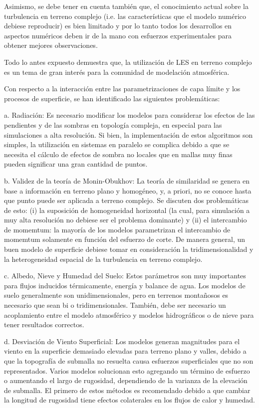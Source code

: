 Asimismo, se debe tener en cuenta también que, el conocimiento actual sobre la turbulencia en terreno complejo (i.e. las características que el modelo numérico debiese reproducir) es bien limitado y por lo tanto todos los desarrollos en aspectos numéricos deben ir de la mano con esfuerzos experimentales para obtener mejores observaciones.

Todo lo antes expuesto demuestra que, la utilización de LES en terreno complejo es un tema de gran interés para la comunidad de modelación atmosférica.

Con respecto a la interacción entre las parametrizaciones de capa límite y los procesos de superficie, se han identificado las siguientes problemáticas:
\begin{enumerate*}
	\item[a.] Radiación: Es necesario modificar los modelos para considerar los efectos de las pendientes y de las sombras en topología compleja, en especial para las simulaciones a alta resolución. Si bien, la implementación de estos algoritmos son simples, la utilización en sistemas en paralelo se complica debido a que se necesita el cálculo de efectos de sombra no locales que en mallas muy finas pueden significar una gran cantidad de puntos.
	\item[b.] Validez de la teoría de Monin-Obukhov: La teoría de similaridad se genera en base a información en terreno plano y homogéneo, y, a priori, no se conoce hasta que punto puede ser aplicada a terreno complejo. Se discuten dos problemáticas de esto: (i) la suposición de homogeneidad horizontal (la cual, para simulación a muy alta resolución no debiese ser el problema dominante) y (ii) el intercambio de momemtum: la mayoría de los modelos parametrizan el intercambio de momemtum solamente en función del esfuerzo de corte. De manera general, un buen modelo de superficie debiese tomar en consideración la tridimensionalidad y la heterogeneidad espacial de la turbulencia en terreno complejo.
	\item[c.] Albedo, Nieve y Humedad del Suelo: Estos parámetros son muy importantes para flujos inducidos térmicamente, energía y balance de agua. Los modelos de suelo generalmente son unidimensionales, pero en terrenos montañosos es necesario  que sean bi o tridimensionales. También, debe ser necesario un acoplamiento entre el modelo atmosférico  y modelos hidrográficos o de nieve para tener resultados correctos. 
	\item[d.] Desviación de Viento Superficial: Los modelos generan magnitudes para el viento en la superficie demasiado elevadas para terreno plano y valles, debido a que la topografía de submalla no resuelta causa esfuerzos superficiales que no son representados. Varios modelos solucionan esto agregando un término de esfuerzo o aumentando el largo de rugosidad, dependiendo de la varianza de la elevación de submalla. El primero de estos métodos es recomendado debido a que cambiar la longitud de rugosidad tiene efectos colaterales en los flujos de calor y humedad.

\end{enumerate*}
